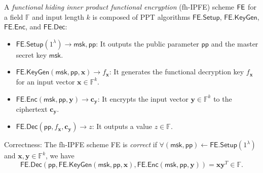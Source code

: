 \begin{definition}
\label{def:fh-IPFE}
	A \emph{functional hiding inner product functional encryption} (fh-IPFE) scheme $\sf FE$ for a field $\mathbb{F}$ and input length $k$ is composed of PPT algorithms $\textsf{FE.Setup}$, $\textsf{FE.KeyGen}$, $\textsf{FE.Enc}$, and $\textsf{FE.Dec}$:

	\begin{itemize}
	
		\item $\textsf{FE.Setup}(1^\lambda) \to \textsf{msk}, \textsf{pp}$: It outputs the public parameter $\textsf{pp}$ and the master secret key $\textsf{msk}$.
	
		\item $\textsf{FE.KeyGen}(\textsf{msk}, \textsf{pp}, \mathbf{x}) \to f_\mathbf{x}$: It generates the functional decryption key $f_\mathbf{x}$ for an input vector $\mathbf{x} \in \mathbb{F}^k$. 
	
		\item $\textsf{FE.Enc}(\textsf{msk}, \textsf{pp}, \mathbf{y}) \to \mathbf{c_y}$: It encrypts the input vector $\mathbf{y} \in \mathbb{F}^k$ to the ciphertext $\mathbf{c_y}$. 
	
		\item $\textsf{FE.Dec}(\textsf{pp}, f_\mathbf{x}, \mathbf{c_y}) \to z$: It outputs a value $z \in \mathbb{F}$.
	
	\end{itemize}
	
	\noindent Correctness: The fh-IPFE scheme \textsf{FE} is \emph{correct} if $\forall (\textsf{msk}, \textsf{pp}) \gets \textsf{FE.Setup}(1^\lambda)$ and $ \mathbf{x}, \mathbf{y} \in \mathbb{F}^k$, we have
	\[
		\textsf{FE.Dec}( \textsf{pp}, \textsf{FE.KeyGen}(\textsf{msk}, \textsf{pp}, \mathbf{x}), \textsf{FE.Enc}(\textsf{msk}, \textsf{pp}, \mathbf{y}) ) = \mathbf{x} \mathbf{y}^T \in \mathbb{F}.
	\]

\end{definition}


